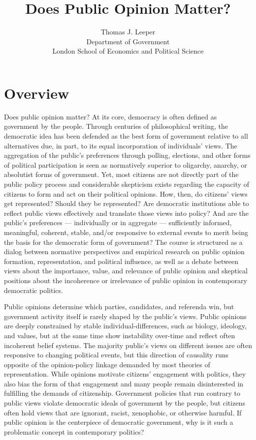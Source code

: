 \documentclass[12pt,a4paper]{article}
\title{Does Public Opinion Matter?}
\author{Thomas J. Leeper\\
Department of Government\\
London School of Economics and Political Science}
\begin{document}
\nobibliography*

\maketitle

\faketableofcontents

\section{Overview}

Does public opinion matter? At its core, democracy is often defined as government by the people. Through centuries of philosophical writing, the democratic idea has been defended as the best form of government relative to all alternatives due, in part, to its equal incorporation of individuals' views. The aggregation of the public's preferences through polling, elections, and other forms of political participation is seen as normatively superior to oligarchy, anarchy, or absolutist forms of government. Yet, most citizens are not directly part of the public policy process and considerable skepticism exists regarding the capacity of citizens to form and act on their political opinions. How, then, do citizens' views get represented? Should they be represented? Are democratic institutions able to reflect public views effectively and translate those views into policy? And are the public's preferences --- individually or in aggregate --- sufficiently informed, meaningful, coherent, stable, and/or responsive to external events to merit being the basis for the democratic form of government? The course is structured as a dialog between normative perspectives and empirical research on public opinion formation, representation, and political influence, as well as a debate between views about the importance, value, and relevance of public opinion and skeptical positions about the incoherence or irrelevance of public opinion in contemporary democratic politics.

Public opinions determine which parties, candidates, and referenda win, but government activity itself is rarely shaped by the public's views. Public opinions are deeply constrained by stable individual-differences, such as biology, ideology, and values, but at the same time show instability over-time and reflect often incoherent belief systems. The majority public's views on different issues are often responsive to changing political events, but this direction of causality runs opposite of the opinion-policy linkage demanded by most theories of representation. While opinions motivate citizens' engagement with politics, they also bias the form of that engagement and many people remain disinterested in fulfilling the demands of citizenship. Government policies that run contrary to public views violate democratic ideals of government by the people, but citizens often hold views that are ignorant, racist, xenophobic, or otherwise harmful. If public opinion is the centerpiece of democratic government, why is it such a problematic concept in contemporary politics?
\end{document}
